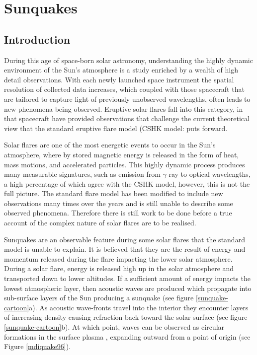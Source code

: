 \section{Sunquakes}
\subsection{Introduction}


During this age of space-born solar astronomy, understanding the highly dynamic environment of the Sun's atmosphere is a study enriched by a wealth of high detail observations. With each newly launched space instrument the spatial resolution of collected data increases, which coupled with those spacecraft that are tailored to capture light of previously unobserved wavelengths, often leads to new phenomena being observed. Eruptive solar flares fall into this category, in that spacecraft have provided observations that challenge the current theoretical view that the standard eruptive flare model (CSHK model: \citep{1964NASSP..50..451C, 1966Natur.211..695S, 1974SoPh...34..323H, 1976SoPh...50...85K} puts forward. 

Solar flares are one of the most energetic events to occur in the Sun's atmosphere, where by stored magnetic energy is released in the form of heat, mass motions, and accelerated particles. This highly dynamic process produces many measurable signatures, such as emission from $\gamma$-ray to optical wavelengths, a high percentage of which agree with the CSHK model, however, this is not the full picture. The standard flare model has been modified to include new observations many times over the years \citep{2011LRSP....8....6S} and is still unable to describe some observed phenomena. Therefore there is still work to be done before a true account of the complex nature of solar flares are to be realised.    

Sunquakes are an observable feature during some solar flares that the standard model is unable to explain. It is believed that they are the result of energy and momentum released during the flare impacting the lower solar atmosphere. During a solar flare, energy is released high up in the solar atmosphere and transported down to lower altitudes. If a sufficient amount of energy impacts the lowest atmospheric layer, then acoustic waves are produced which propagate into sub-surface layers of the Sun producing a sunquake (see figure \ref{sunquake-cartoon}a). As acoustic wave-fronts travel into the interior they encounter layers of increasing density causing refraction back toward the solar surface (see figure \ref{sunquake-cartoon}b). At which point, waves can be observed as circular formations in the surface plasma , expanding outward from a point of origin (see Figure \ref{mdiquake96}). 


